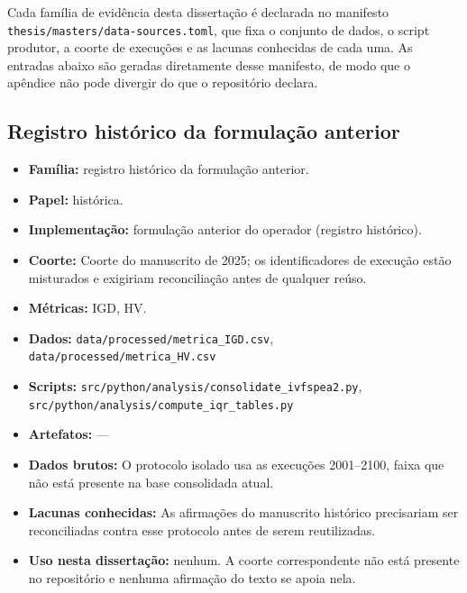
Cada família de evidência desta dissertação é declarada no manifesto \texttt{thesis/masters/data-sources.toml}, que fixa o conjunto de dados, o script produtor, a coorte de execuções e as lacunas conhecidas de cada uma. As entradas abaixo são geradas diretamente desse manifesto, de modo que o apêndice não pode divergir do que o repositório declara.

\subsection*{Registro histórico da formulação anterior}
\begin{itemize}[nosep]\raggedright
    \item \textbf{Família:} registro histórico da formulação anterior.
    \item \textbf{Papel:} histórica.
    \item \textbf{Implementação:} formulação anterior do operador (registro histórico).
    \item \textbf{Coorte:} Coorte do manuscrito de 2025; os identificadores de execução estão misturados e exigiriam reconciliação antes de qualquer reúso.
    \item \textbf{Métricas:} IGD, HV.
    \item \textbf{Dados:} \texttt{data/\allowbreak{}processed/\allowbreak{}metrica\_\allowbreak{}IGD.csv}, \texttt{data/\allowbreak{}processed/\allowbreak{}metrica\_\allowbreak{}HV.csv}
    \item \textbf{Scripts:} \texttt{src/\allowbreak{}python/\allowbreak{}analysis/\allowbreak{}consolidate\_\allowbreak{}ivfspea2.py}, \texttt{src/\allowbreak{}python/\allowbreak{}analysis/\allowbreak{}compute\_\allowbreak{}iqr\_\allowbreak{}tables.py}
    \item \textbf{Artefatos:} ---
    \item \textbf{Dados brutos:} O protocolo isolado usa as execuções 2001--2100, faixa que não está presente na base consolidada atual.
    \item \textbf{Lacunas conhecidas:} As afirmações do manuscrito histórico precisariam ser reconciliadas contra esse protocolo antes de serem reutilizadas.
    \item \textbf{Uso nesta dissertação:} nenhum. A coorte correspondente não está presente no repositório e nenhuma afirmação do texto se apoia nela.
\end{itemize}

